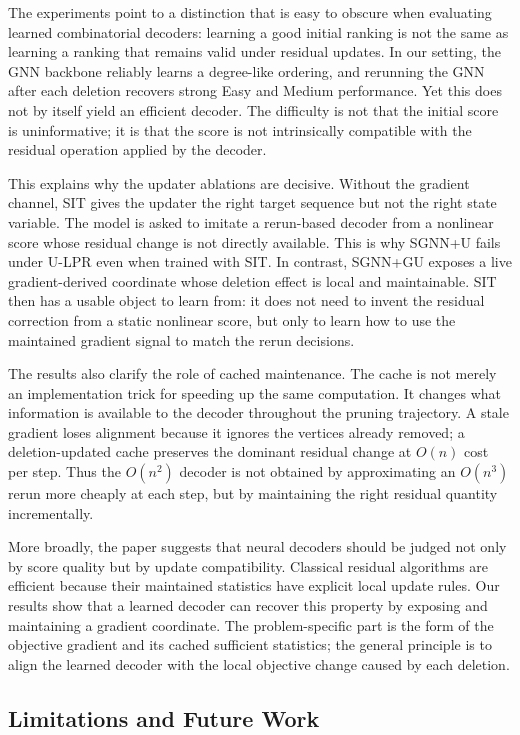 \documentclass[journal,article,submit,pdftex,moreauthors]{Definitions/mdpi}
\begin{document}
The experiments point to a distinction that is easy to obscure when evaluating
learned combinatorial decoders: learning a good initial ranking is not the same as
learning a ranking that remains valid under residual updates. In our setting, the
GNN backbone reliably learns a degree-like ordering, and rerunning the GNN after
each deletion recovers strong Easy and Medium performance. Yet this does not by
itself yield an efficient decoder. The difficulty is not that the initial score is
uninformative; it is that the score is not intrinsically compatible with the residual
operation applied by the decoder.

This explains why the updater ablations are decisive. Without the gradient channel,
SIT gives the updater the right target sequence but not the right state variable.
The model is asked to imitate a rerun-based decoder from a nonlinear score whose
residual change is not directly available. This is why SGNN+U fails under U-LPR
even when trained with SIT. In contrast, SGNN+GU exposes a live gradient-derived
coordinate whose deletion effect is local and maintainable. SIT then has a usable
object to learn from: it does not need to invent the residual correction from a
static nonlinear score, but only to learn how to use the maintained gradient signal
to match the rerun decisions.

The results also clarify the role of cached maintenance. The cache is not merely an
implementation trick for speeding up the same computation. It changes what
information is available to the decoder throughout the pruning trajectory. A stale
gradient loses alignment because it ignores the vertices already removed; a
deletion-updated cache preserves the dominant residual change at $O(n)$ cost per
step. Thus the $O(n^2)$ decoder is not obtained by approximating an $O(n^3)$ rerun
more cheaply at each step, but by maintaining the right residual quantity
incrementally.

More broadly, the paper suggests that neural decoders should be judged not only by
score quality but by update compatibility. Classical residual algorithms are
efficient because their maintained statistics have explicit local update rules. Our
results show that a learned decoder can recover this property by exposing and
maintaining a gradient coordinate. The problem-specific part is the form of the
objective gradient and its cached sufficient statistics; the general principle is to
align the learned decoder with the local objective change caused by each deletion.

\subsection{Limitations and Future Work}
\end{document}
